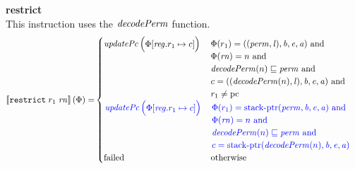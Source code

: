 \documentclass[a4paper]{article}
\begin{document}
\noindent\textbf{restrict}\\
This instruction uses the $\decPerm{}$ function.
\begin{align*}
  \sem{\trestrict{r_1}{\rn}}(\Phi) = &
                                      \begin{cases}
                                        \updPcAddr{}\left(
                                          \arraycolsep=0pt
                                          \begin{array}{rl}
                                          \Phi &\updReg{r_1}{c}
                                          \end{array} \right)
&
                                        \arraycolsep=0pt
                                        \begin{array}[t]{l}
                                          \Phi(r_1) = ((\perm,\lin),\baddr,\eaddr,\aaddr) \tand \\
                                          \Phi(\rn) = n \tand\\
                                          \decPerm{n} \sqsubseteq \perm \tand \\
                                          c = ((\decPerm{n},\lin),\baddr,\eaddr,\aaddr) \tand\\
                                          r_1 \neq \pcreg
                                        \end{array}
                                        \\
                                        \sourcecolor\left.
                                        \updPcAddr{}\left(
                                          \arraycolsep=0pt
                                          \begin{array}{rl}
                                          \Phi &\updReg{r_1}{c}
                                          \end{array}\right)\right.
                                        &
                                        \sourcecolor\left.
                                        \arraycolsep=0pt
                                        \begin{array}[t]{l}
                                          \Phi(r_1) = \stkptr{\perm,\baddr,\eaddr,\aaddr} \tand \\
                                          \Phi(\rn) = n \tand\\
                                          \decPerm{n} \sqsubseteq \perm \tand \\
                                          c = \stkptr{\decPerm{n},\baddr,\eaddr,\aaddr}
                                        \end{array}\right.
                                        \\
                                        \failed & \totherwise
                                      \end{cases}
\end{align*}
\end{document}
